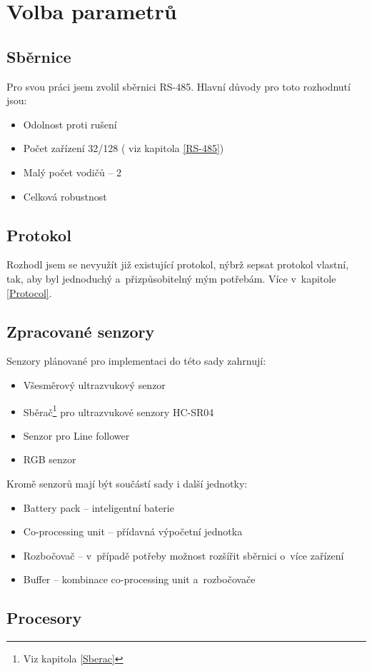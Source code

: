 \chapter{Volba parametrů}
\section{Sběrnice}
Pro svou práci jsem zvolil sběrnici RS-485.
Hlavní důvody pro toto rozhodnutí jsou:
\begin{itemize}
    \item Odolnost proti rušení
    \item Počet zařízení 32/128 ( viz kapitola \ref{RS-485})
    \item Malý počet vodičů -- 2
    \item Celková robustnost
\end{itemize}

\section{Protokol}
Rozhodl jsem se nevyužít již existující protokol, nýbrž sepsat protokol vlastní, tak, aby byl jednoduchý a~přizpůsobitelný mým potřebám.
Více v~kapitole \ref{Protocol}.
\section{Zpracované senzory}
Senzory plánované pro implementaci do této sady zahrnují:
\begin{itemize}
    \item Všesměrový ultrazvukový senzor
    \item Sběrač\footnote{Viz kapitola \ref{Sberac}} pro ultrazvukové senzory HC-SR04 
    \item Senzor pro Line follower
    \item RGB senzor
    
\end{itemize}
Kromě senzorů mají být součástí sady i další jednotky:
\begin{itemize}
    \item Battery pack -- inteligentní baterie
    \item Co-processing unit -- přídavná výpočetní jednotka
    \item Rozbočovač -- v~případě potřeby možnost rozšířit sběrnici o~více zařízení
    \item Buffer -- kombinace co-processing unit a~rozbočovače
\end{itemize}
\section{Procesory}

